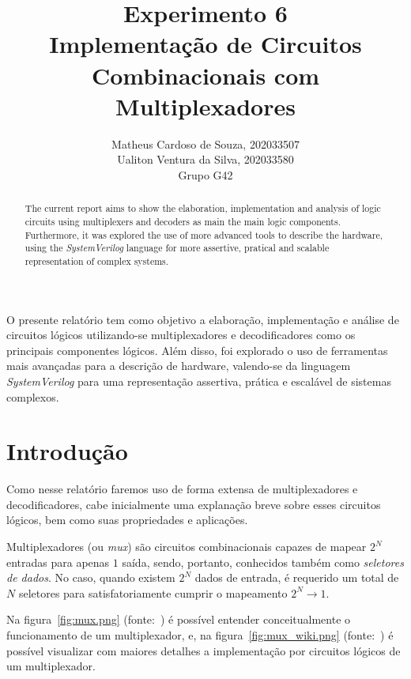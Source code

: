 \documentclass[12pt]{article}
\title{Experimento 6\\
Implementação de Circuitos Combinacionais com Multiplexadores}
\author{Matheus Cardoso de Souza, 202033507\\
        Ualiton Ventura da Silva, 202033580\\
        Grupo G42
}
\begin{document}
\maketitle

 \begin{abstract}
   The current report aims to show the elaboration, implementation and analysis
   of logic circuits using multiplexers and decoders as main the main logic
   components. Furthermore, it was explored the use of more advanced tools to
   describe the hardware, using the \emph{SystemVerilog} language for more
   assertive, pratical and scalable representation of complex systems.
 \end{abstract}

 \begin{resumo}
   O presente relatório tem como objetivo a elaboração, implementação e análise
   de circuitos lógicos utilizando-se multiplexadores e decodificadores como os
   principais componentes lógicos. Além disso, foi explorado o uso de
   ferramentas mais avançadas para a descrição de hardware, valendo-se da
   linguagem \emph{SystemVerilog} para uma representação assertiva, prática e
   escalável de sistemas complexos.
 \end{resumo}


\section{Introdução}\label{sec:Introducao}

Como nesse relatório faremos uso de forma extensa de multiplexadores e
decodificadores, cabe inicialmente uma explanação breve sobre esses circuitos
lógicos, bem como suas propriedades e aplicações.


Multiplexadores (ou \emph{mux}) são circuitos combinacionais capazes de mapear
$2^{N}$ entradas para apenas $1$ saída, sendo, portanto, conhecidos também como
\emph{seletores de dados}. No caso, quando existem $2^{N}$ dados de entrada, é
requerido um total de $N$ seletores para satisfatoriamente cumprir o mapeamento
$2^{N} \rightarrow 1$.

Na figura~\ref{fig:mux.png} (fonte:~\cite{isc_mod3}) é possível
entender conceitualmente o funcionamento de um multiplexador, e, na
figura~\ref{fig:mux_wiki.png} (fonte:~\cite{wiki_mux}) é possível visualizar com
maiores detalhes a implementação por circuitos lógicos de um multiplexador.
\end{document}
